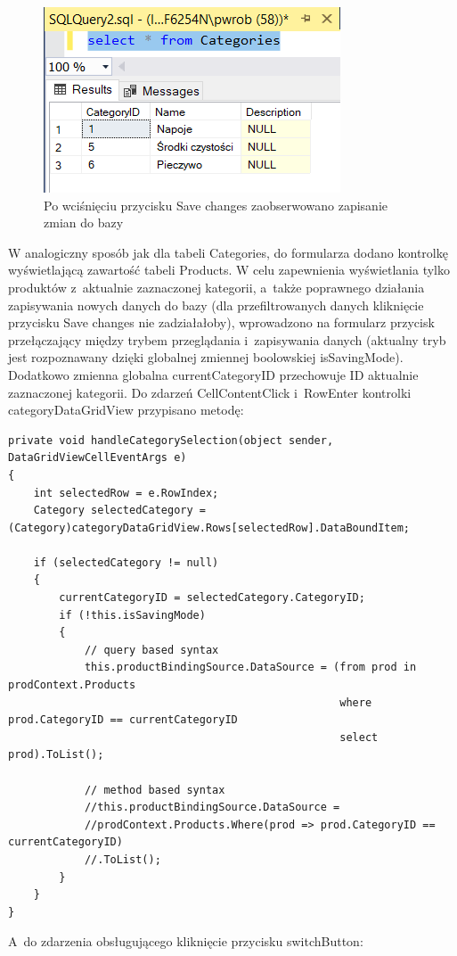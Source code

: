 \documentclass[12pt, a4paper]{mwart}
\begin{document}
\begin{figure}
  \centering
  \includegraphics[scale=0.5]{IV/4-4.png}
  \caption{Po wciśnięciu przycisku Save changes zaobserwowano zapisanie zmian do bazy}
  \label{rys:4.4}
\end{figure}

W analogiczny sposób jak dla tabeli Categories, do formularza dodano kontrolkę wyświetlającą zawartość tabeli Products. W celu zapewnienia wyświetlania tylko produktów z~aktualnie zaznaczonej kategorii, a~także poprawnego działania zapisywania nowych danych do bazy (dla przefiltrowanych danych kliknięcie przycisku Save changes nie zadziałałoby), wprowadzono na formularz przycisk przełączający między trybem przeglądania i~zapisywania danych (aktualny tryb jest rozpoznawany dzięki globalnej zmiennej boolowskiej isSavingMode). Dodatkowo zmienna globalna currentCategoryID przechowuje ID aktualnie zaznaczonej kategorii. Do zdarzeń CellContentClick i~RowEnter kontrolki categoryDataGridView przypisano metodę:

\begin{lstlisting}
private void handleCategorySelection(object sender, DataGridViewCellEventArgs e)
{
	int selectedRow = e.RowIndex;
	Category selectedCategory = (Category)categoryDataGridView.Rows[selectedRow].DataBoundItem;

	if (selectedCategory != null)
	{
		currentCategoryID = selectedCategory.CategoryID;
		if (!this.isSavingMode)
		{
			// query based syntax
			this.productBindingSource.DataSource = (from prod in prodContext.Products
													where prod.CategoryID == currentCategoryID
                                                    select prod).ToList();

			// method based syntax
			//this.productBindingSource.DataSource = 
            //prodContext.Products.Where(prod => prod.CategoryID == currentCategoryID)
            //.ToList();
		}
	}
}
\end{lstlisting}

A~do zdarzenia obsługującego kliknięcie przycisku switchButton:
\end{document}
